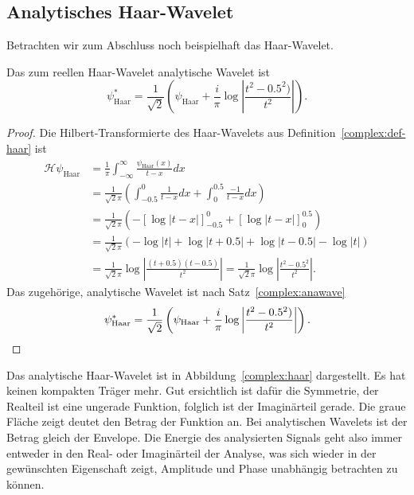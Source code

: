 \subsection{Analytisches Haar-Wavelet}
Betrachten wir zum Abschluss noch beispielhaft das Haar-Wavelet.
\begin{satz}
    Das zum reellen Haar-Wavelet analytische Wavelet ist
    \[\psi^\ast_{\text{Haar}} = \frac{1}{\sqrt{2}}\left(\psi_{\text{Haar}} + \frac{i}{\pi} \log\left|\frac{t^2-0.5^2)}{t^2}\right|\right).\]
\end{satz}

\begin{proof}
    Die Hilbert-Transformierte des Haar-Wavelets aus Definition~\ref{complex:def-haar} ist
    \begin{align*}
    \mathcal{H} \psi_{\text{Haar}}
    &= \frac{1}{\pi} \int_{-\infty}^{\infty} \frac{\psi_{\text{Haar}}(x)}{t-x} dx\\
    &= \frac{1}{\sqrt2\pi}\left( \int_{-0.5}^{0} \frac{1}{t-x}dx + \int_{0}^{0.5} \frac{-1}{t-x}dx \right)\\
    &= \frac{1}{\sqrt2\pi} \left( -\left[\log \left|t-x\right| \right]_{-0.5}^{0} + \left[\log\left|t-x\right| \right]_{0}^{0.5} \right)\\
    &= \frac{1}{\sqrt2\pi} \left( -\log\left|t\right| + \log\left|t+0.5\right| + \log\left|t-0.5\right| - \log\left|t\right|\right)\\
    &= \frac{1}{\sqrt2\pi} \log\left|\frac{(t+0.5)(t-0.5)}{t^2}\right|
    = \frac{1}{\sqrt2\pi} \log\left|\frac{t^2-0.5^2}{t^2}\right|.
    \end{align*}
    Das zugehörige, analytische Wavelet ist nach Satz~\eqref{complex:anawave}
    \[
    \psi^\ast_{\text{Haar}} = \frac{1}{\sqrt{2}}\left(\psi_{\text{Haar}} + \frac{i}{\pi} \log\left|\frac{t^2-0.5^2)}{t^2}\right|\right).\qedhere
    \]
\end{proof}

Das analytische Haar-Wavelet ist in Abbildung~\ref{complex:haar} dargestellt.
Es hat keinen kompakten Träger mehr.
Gut ersichtlich ist dafür die Symmetrie, der Realteil ist eine ungerade Funktion, folglich ist der Imaginärteil gerade.
Die graue Fläche zeigt deutet den Betrag der Funktion an.
Bei analytischen Wavelets ist der Betrag gleich der Envelope.
Die Energie des analysierten Signals geht also immer entweder in den Real- oder Imaginärteil der Analyse, was sich wieder in der gewünschten Eigenschaft zeigt, Amplitude und Phase unabhängig betrachten zu können.

